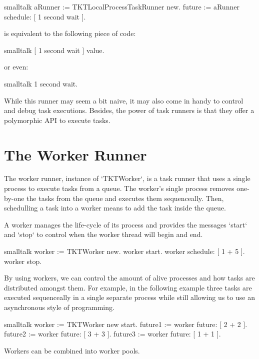 \documentclass[10pt,twoside,english]{_support/latex/sbabook/sbabook}
\begin{document}
\begin{displaycode}{smalltalk}
aRunner := TKTLocalProcessTaskRunner new.
future := aRunner schedule: [ 1 second wait ].
\end{displaycode}

is equivalent to the following piece of code:

\begin{displaycode}{smalltalk}
[ 1 second wait ] value.
\end{displaycode}

or even:

\begin{displaycode}{smalltalk}
1 second wait.
\end{displaycode}

While this runner may seem a bit naive, it may also come in handy to control and debug task executions. Besides, the power of task runners is that they offer a polymorphic API to execute tasks.
\section{The Worker Runner}
The worker runner, instance of `TKTWorker`, is a task runner that uses a single process to execute tasks from a queue. The worker's single process removes one-by-one the tasks from the queue and executes them sequenceally. Then, schedulling a task into a worker means to add the task inside the queue.

A worker manages the life-cycle of its process and provides the messages `start` and `stop` to control when the worker thread will begin and end.

\begin{displaycode}{smalltalk}
worker := TKTWorker new.
worker start.
worker schedule: [ 1 + 5 ].
worker stop.
\end{displaycode}

By using workers, we can control the amount of alive processes and how tasks are distributed amongst them. For example, in the following example three tasks are executed sequenceally in a single separate process while still allowing us to use an asynchronous style of programming.

\begin{displaycode}{smalltalk}
worker := TKTWorker new start.
future1 := worker future: [ 2 + 2 ].
future2 := worker future: [ 3 + 3 ].
future3 := worker future: [ 1 + 1 ].
\end{displaycode}

Workers can be combined into worker pools.
\end{document}
